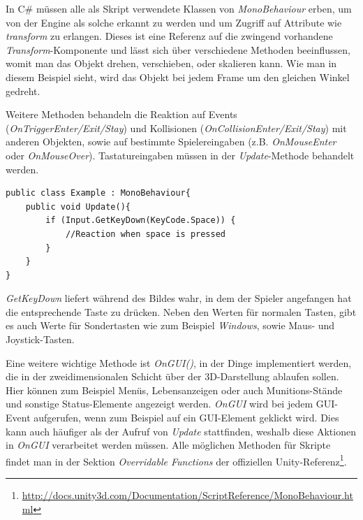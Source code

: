 In C\# müssen alle als Skript verwendete Klassen von \textit{MonoBehaviour} erben, um von der Engine als solche erkannt zu werden und um Zugriff auf Attribute wie \textit{transform} zu erlangen. Dieses ist eine Referenz auf die zwingend vorhandene \textit{Transform}-Komponente und lässt sich über verschiedene Methoden beeinflussen, womit man das Objekt drehen, verschieben, oder skalieren kann. Wie man in diesem Beispiel sieht, wird das Objekt bei jedem Frame um den gleichen Winkel gedreht.

Weitere Methoden behandeln die Reaktion auf Events (\textit{OnTriggerEnter/Exit/Stay}) und Kollisionen (\textit{OnCollisionEnter/Exit/Stay}) mit anderen Objekten, sowie auf bestimmte Spielereingaben (z.B. \textit{OnMouseEnter} oder \textit{OnMouseOver}). Tastatureingaben müssen in der \textit{Update}-Methode behandelt werden.\\

\begin{lstlisting}[caption={[Behandlung von Tastatureingaben]Behandlung von Tastatureingaben}]
public class Example : MonoBehaviour{
	public void Update(){
		if (Input.GetKeyDown(KeyCode.Space)) {
			//Reaction when space is pressed
		}
	}
}
\end{lstlisting}

\textit{GetKeyDown} liefert während des Bildes wahr, in dem der Spieler angefangen hat die entsprechende Taste zu drücken. Neben den Werten für normalen Tasten, gibt es auch Werte für Sondertasten wie zum Beispiel \textit{Windows}, sowie Maus- und Joystick-Tasten.

Eine weitere wichtige Methode ist \textit{OnGUI()}, in der Dinge implementiert werden, die in der zweidimensionalen Schicht über der 3D-Darstellung ablaufen sollen. Hier können zum Beispiel Menüs, Lebensanzeigen oder auch Munitions-Stände und sonstige Status-Elemente angezeigt werden. \textit{OnGUI} wird bei jedem GUI-Event aufgerufen, wenn zum Beispiel auf ein GUI-Element geklickt wird. Dies kann auch häufiger als der Aufruf von \textit{Update} stattfinden, weshalb diese Aktionen in \textit{OnGUI} verarbeitet werden müssen. Alle möglichen Methoden für Skripte findet man in der Sektion \textit{Overridable Functions} der offiziellen Unity-Referenz\footnote{\url{http://docs.unity3d.com/Documentation/ScriptReference/MonoBehaviour.html}}.
\pagebreak

